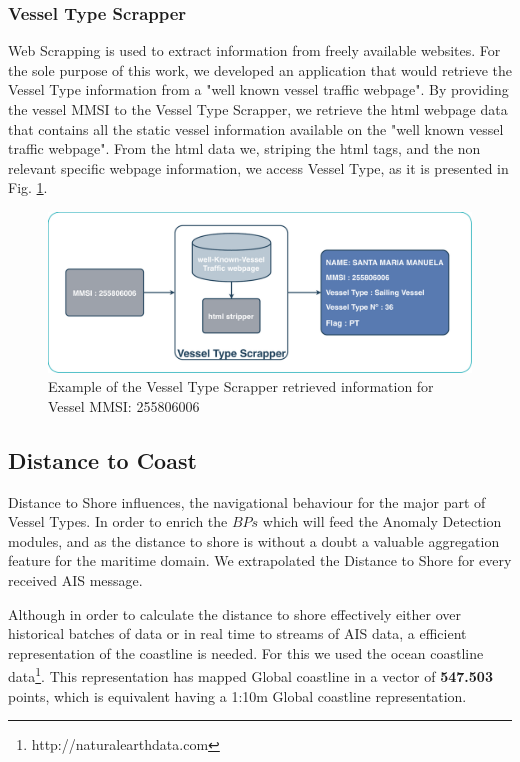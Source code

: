\subsubsection{Vessel Type Scrapper}
Web Scrapping is used to extract information from freely available websites. For the sole purpose of this work, we developed an application that would retrieve the Vessel Type information from a "well known vessel traffic webpage".
By providing the vessel MMSI to the Vessel Type Scrapper, we retrieve the html webpage data that contains all the static vessel information available on the "well known vessel traffic webpage". From the html data we, striping the html tags, and the non relevant specific webpage information, we access Vessel Type, as it is presented in Fig. \ref{fig:Scraper}.

\begin{figure}[H]
	\centering
	\includegraphics[scale = .4]{figures/Ch4/scrapper}
    \caption{Example of the Vessel Type Scrapper retrieved information for Vessel MMSI: 255806006}
    \label{fig:Scraper}
\end{figure}


\subsection{Distance to Coast}
\label{subsection: Distance to Coast}
Distance to Shore influences, the navigational behaviour for the major part of Vessel Types. In order to enrich the $BPs$ which will feed the Anomaly Detection modules, and as the distance to shore is without a doubt a valuable aggregation feature for the maritime domain. We extrapolated the Distance to Shore for every received AIS message. 

Although in order to calculate the distance to shore effectively either over historical batches of data or in real time to streams of AIS data, a efficient representation of the coastline is needed. 
For this we used the ocean coastline data\footnote{http://naturalearthdata.com}. This representation has mapped Global coastline in a vector of \textbf{547.503} points, which is equivalent having a 1:10m Global coastline representation.

